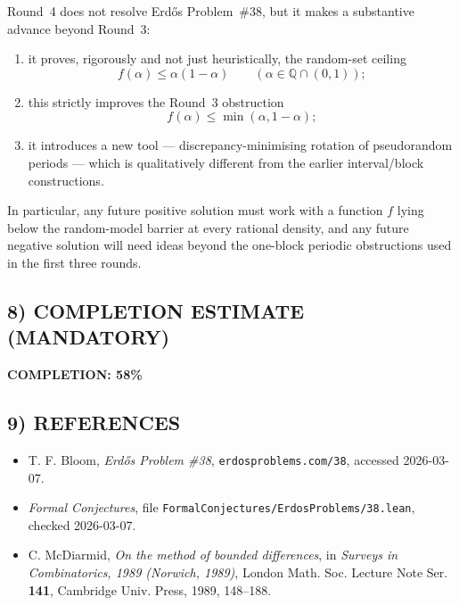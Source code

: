 Round~4 does not resolve Erd\H{o}s Problem~\#38, but it makes a substantive advance beyond Round~3:
\begin{enumerate}
\item it proves, rigorously and not just heuristically, the random-set ceiling
\[
 f(\alpha)\le \alpha(1-\alpha)
\qquad (\alpha\in \mathbb Q\cap(0,1));
\]
\item this strictly improves the Round~3 obstruction
\[
 f(\alpha)\le \min(\alpha,1-\alpha);
\]
\item it introduces a new tool --- discrepancy-minimising rotation of pseudorandom periods --- which is qualitatively different from the earlier interval/block constructions.
\end{enumerate}
In particular, any future positive solution must work with a function $f$ lying below the random-model barrier at every rational density, and any future negative solution will need ideas beyond the one-block periodic obstructions used in the first three rounds.

\subsection*{8) COMPLETION ESTIMATE (MANDATORY)}
\textbf{COMPLETION: 58\%}

\subsection*{9) REFERENCES}
\begin{itemize}
\item T. F. Bloom, \emph{Erd\H{o}s Problem \#38}, \texttt{erdosproblems.com/38}, accessed 2026-03-07.
\item \emph{Formal Conjectures}, file \texttt{FormalConjectures/ErdosProblems/38.lean}, checked 2026-03-07.
\item C. McDiarmid, \emph{On the method of bounded differences}, in \emph{Surveys in Combinatorics, 1989 (Norwich, 1989)}, London Math. Soc. Lecture Note Ser. \textbf{141}, Cambridge Univ. Press, 1989, 148--188.
\end{itemize}
